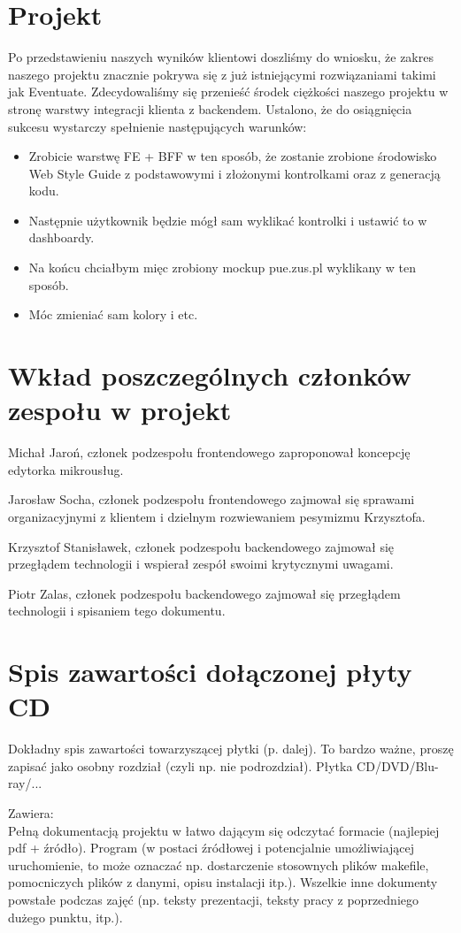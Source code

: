 \documentclass[licencjacka]{pracamgr}
\begin{document}
\chapter{Projekt}

Po przedstawieniu naszych wyników klientowi doszliśmy do wniosku, że zakres naszego projektu znacznie pokrywa się z już istniejącymi rozwiązaniami takimi jak Eventuate. Zdecydowaliśmy się przenieść środek ciężkości naszego projektu w stronę warstwy integracji klienta z backendem. Ustalono, że do osiągnięcia sukcesu wystarczy spełnienie następujących warunków: %
\begin{itemize}
	\item Zrobicie warstwę FE + BFF w ten sposób, że zostanie zrobione środowisko Web Style Guide z podstawowymi i złożonymi kontrolkami oraz z generacją kodu.
	\item Następnie użytkownik będzie mógł sam wyklikać kontrolki i ustawić to w dashboardy.
	\item Na końcu chciałbym mięc zrobiony mockup pue.zus.pl wyklikany w ten sposób.
	\item Móc zmieniać sam kolory i etc.
\end{itemize}

\chapter{Wkład poszczególnych członków zespołu w projekt}\label{r:wklad}
Michał Jaroń, członek podzespołu frontendowego zaproponował koncepcję edytorka mikrousług.

Jarosław Socha, członek podzespołu frontendowego zajmował się sprawami organizacyjnymi z klientem i dzielnym rozwiewaniem pesymizmu Krzysztofa.

Krzysztof Stanisławek, członek podzespołu backendowego zajmował się przegłądem technologii i wspierał zespół swoimi krytycznymi uwagami.

Piotr Zalas, członek podzespołu backendowego zajmował się przegłądem technologii i spisaniem tego dokumentu.

\appendix
\chapter{Spis zawartości dołączonej płyty CD}\label{r:spis}
Dokładny spis zawartości towarzyszącej płytki (p. dalej). To bardzo ważne, proszę zapisać jako osobny rozdział (czyli np. nie podrozdział). Płytka CD/DVD/Blu-ray/...

Zawiera:\\
Pełną dokumentacją projektu w łatwo dającym się odczytać formacie (najlepiej pdf + źródło).
Program (w postaci źródłowej i potencjalnie umożliwiającej uruchomienie, to może oznaczać np. dostarczenie stosownych plików makefile, pomocniczych plików z danymi, opisu instalacji itp.).
Wszelkie inne dokumenty powstałe podczas zajęć (np. teksty prezentacji, teksty pracy z poprzedniego dużego punktu, itp.).
\end{document}
